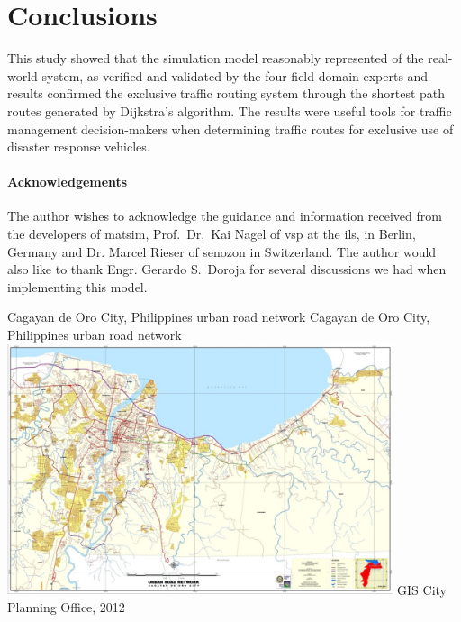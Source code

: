 \section{Conclusions}
This study showed that the simulation model reasonably represented of the real-world system, as verified and validated by the four field domain experts and results confirmed the exclusive traffic routing system through the shortest path routes generated by Dijkstra’s algorithm. The results were useful tools for traffic management decision-makers when determining traffic routes for exclusive use of disaster response vehicles.

\paragraph{Acknowledgements}
The author wishes to acknowledge the guidance and information received from the developers of \gls{matsim}, Prof.\ Dr.\ Kai Nagel of \gls{vsp} at the \gls{ils}, in Berlin, Germany and Dr. Marcel Rieser of \gls{senozon} in Switzerland. The author would also like to thank Engr. Gerardo S.\ Doroja for several discussions we had when implementing this model.

\createfigure%
{Cagayan de Oro City, Philippines urban road network}%
{Cagayan de Oro City, Philippines urban road network}%
{\label{fig:philippines_fig1}}%
{\includegraphics[width=0.85\textwidth, angle=0]{./scenarios/figures/philippines_fig1.png}}%
{GIS City Planning Office, 2012}

